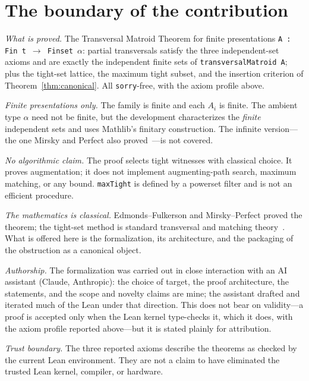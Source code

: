 \documentclass[11pt]{article}
\newcommand{\lean}[1]{\texttt{#1}}
\begin{document}
\section{The boundary of the contribution}\label{sec:boundary}

\emph{What is proved.} The Transversal Matroid Theorem for finite presentations
\lean{A : Fin t $\to$ Finset $\alpha$}: partial transversals satisfy the three independent-set axioms and are
exactly the independent finite sets of \lean{transversalMatroid A}; plus the tight-set lattice, the
maximum tight subset, and the insertion criterion of Theorem~\ref{thm:canonical}. All
\lean{sorry}-free, with the axiom profile above.

\emph{Finite presentations only.} The family is finite and each $A_i$ is finite. The ambient type
$\alpha$ need not be finite, but the development characterizes the \emph{finite} independent sets
and uses Mathlib's finitary construction. The infinite version---the one Mirsky and Perfect also
proved~\cite{mirskyperfect}---is not covered.

\emph{No algorithmic claim.} The proof selects tight witnesses with classical choice. It proves
augmentation; it does not implement augmenting-path search, maximum matching, or any bound.
\lean{maxTight} is defined by a powerset filter and is not an efficient procedure.

\emph{The mathematics is classical.} Edmonds--Fulkerson and Mirsky--Perfect proved the theorem;
the tight-set method is standard transversal and matching theory~\cite{ore,dm,lovaszplummer,welsh,oxley}.
What is offered here is the formalization, its architecture, and the packaging of the obstruction
as a canonical object.

\emph{Authorship.} The formalization was carried out in close interaction with an AI assistant
(Claude, Anthropic): the choice of target, the proof architecture, the statements, and the scope
and novelty claims are mine; the assistant drafted and iterated much of the Lean under that
direction. This does not bear on validity---a proof is accepted only when the Lean kernel
type-checks it, which it does, with the axiom profile reported above---but it is stated plainly for
attribution.

\emph{Trust boundary.} The three reported axioms describe the theorems as checked by the current
Lean environment. They are not a claim to have eliminated the trusted Lean kernel, compiler, or
hardware.
\end{document}
